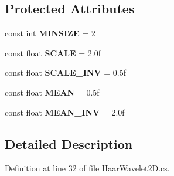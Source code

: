 \subsection*{\-Protected \-Attributes}
\begin{DoxyCompactItemize}
\item 
\hypertarget{class_turbo_wavelets_1_1_haar_wavelet2_d_a841ed0ce87560b5a4e5b94e4b2630765}{const int {\bfseries \-M\-I\-N\-S\-I\-Z\-E} = 2}\label{class_turbo_wavelets_1_1_haar_wavelet2_d_a841ed0ce87560b5a4e5b94e4b2630765}

\item 
\hypertarget{class_turbo_wavelets_1_1_haar_wavelet2_d_a1c6cc94e0c41dd74fc3c8f7e36bf123f}{const float {\bfseries \-S\-C\-A\-L\-E} = 2.\-0f}\label{class_turbo_wavelets_1_1_haar_wavelet2_d_a1c6cc94e0c41dd74fc3c8f7e36bf123f}

\item 
\hypertarget{class_turbo_wavelets_1_1_haar_wavelet2_d_adbc2c681478c8bd315a77b6ddf57e9bd}{const float {\bfseries \-S\-C\-A\-L\-E\-\_\-\-I\-N\-V} = 0.\-5f}\label{class_turbo_wavelets_1_1_haar_wavelet2_d_adbc2c681478c8bd315a77b6ddf57e9bd}

\item 
\hypertarget{class_turbo_wavelets_1_1_haar_wavelet2_d_af0a09712e36a5e8abcaf67e9352c7529}{const float {\bfseries \-M\-E\-A\-N} = 0.\-5f}\label{class_turbo_wavelets_1_1_haar_wavelet2_d_af0a09712e36a5e8abcaf67e9352c7529}

\item 
\hypertarget{class_turbo_wavelets_1_1_haar_wavelet2_d_aca358f40b15421e2ad216236fa000cce}{const float {\bfseries \-M\-E\-A\-N\-\_\-\-I\-N\-V} = 2.\-0f}\label{class_turbo_wavelets_1_1_haar_wavelet2_d_aca358f40b15421e2ad216236fa000cce}

\end{DoxyCompactItemize}


\subsection{\-Detailed \-Description}


\-Definition at line 32 of file \-Haar\-Wavelet2\-D.\-cs.



